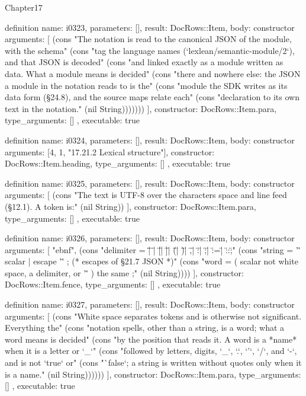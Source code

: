 \begin{lexlean}{Chapter17}
\begin{semanticmodule}
definition{
  name: i0323,
  parameters: [],
  result: DocRows::Item,
  body: constructor{
    arguments: [
      (cons "The notation is read to the canonical JSON of the module, with the schema" (cons "tag the language names (`lexlean/semantic-module/2`), and that JSON is decoded" (cons "and linked exactly as a module written as data. What a module means is decided" (cons "there and nowhere else: the JSON a module in the notation reads to is the" (cons "module the SDK writes as its data form (§24.8), and the source maps relate each" (cons "declaration to its own text in the notation." (nil String)))))))
    ],
    constructor: DocRows::Item.para,
    type_arguments: []
  },
  executable: true
}

definition{
  name: i0324,
  parameters: [],
  result: DocRows::Item,
  body: constructor{
    arguments: [4, 1, "17.21.2 Lexical structure"],
    constructor: DocRows::Item.heading,
    type_arguments: []
  },
  executable: true
}

definition{
  name: i0325,
  parameters: [],
  result: DocRows::Item,
  body: constructor{
    arguments: [
      (cons "The text is UTF-8 over the characters space and line feed (§12.1). A token is:" (nil String))
    ],
    constructor: DocRows::Item.para,
    type_arguments: []
  },
  executable: true
}

definition{
  name: i0326,
  parameters: [],
  result: DocRows::Item,
  body: constructor{
    arguments: [
      "ebnf",
      (cons "delimiter = \"{\" | \"}\" | \"[\" | \"]\" | \"(\" | \")\" | \",\" | \":\" | \";\" | \":=\" | \"::\" ;" (cons "string    = '\"' { scalar | escape } '\"' ;           (* escapes of §21.7 JSON *)" (cons "word      = ( scalar not white space, a delimiter, or '\"' ) { the same } ;" (nil String))))
    ],
    constructor: DocRows::Item.fence,
    type_arguments: []
  },
  executable: true
}

definition{
  name: i0327,
  parameters: [],
  result: DocRows::Item,
  body: constructor{
    arguments: [
      (cons "White space separates tokens and is otherwise not significant. Everything the" (cons "notation spells, other than a string, is a word; what a word means is decided" (cons "by the position that reads it. A word is a *name* when it is a letter or `_`" (cons "followed by letters, digits, `_`, `.`, `'`, `/`, and `-`, and is not `true` or" (cons "`false`; a string is written without quotes only when it is a name." (nil String))))))
    ],
    constructor: DocRows::Item.para,
    type_arguments: []
  },
  executable: true
}


\end{semanticmodule}
\end{lexlean}
